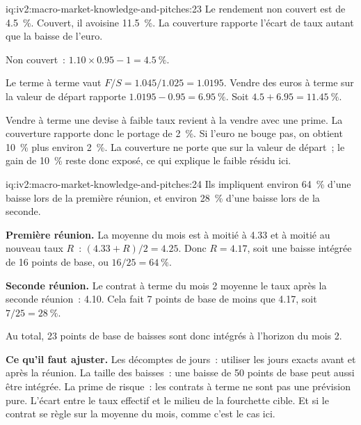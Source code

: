 \begin{solution}{iq:iv2:macro-market-knowledge-and-pitches:23}
Le rendement non couvert est de 4.5~\%. Couvert, il avoisine 11.5~\%. La couverture rapporte l'écart de taux autant que la baisse de l'euro.

Non couvert~: $1.10 \times 0.95 - 1 = 4.5~\%$.

Le terme à terme vaut $F/S = 1.045/1.025 = 1.0195$. Vendre des euros à terme sur la valeur de départ rapporte $1.0195 - 0.95 = 6.95~\%$. Soit $4.5 + 6.95 = 11.45~\%$.

Vendre à terme une devise à faible taux revient à la vendre avec une prime. La couverture rapporte donc le portage de 2~\%. Si l'euro ne bouge pas, on obtient 10~\% plus environ 2~\%. La couverture ne porte que sur la valeur de départ~; le gain de 10~\% reste donc exposé, ce qui explique le faible résidu ici.

\end{solution}

\begin{solution}{iq:iv2:macro-market-knowledge-and-pitches:24}
Ils impliquent environ 64~\% d'une baisse lors de la première réunion, et environ 28~\% d'une baisse lors de la seconde.

\textbf{Première réunion.} La moyenne du mois est à moitié à 4.33 et à moitié au nouveau taux $R$~: $(4.33 + R)/2 = 4.25$. Donc $R = 4.17$, soit une baisse intégrée de 16 points de base, ou $16/25 = 64~\%$.

\textbf{Seconde réunion.} Le contrat à terme du mois 2 moyenne le taux après la seconde réunion~: 4.10. Cela fait 7 points de base de moins que 4.17, soit $7/25 = 28~\%$.

Au total, 23 points de base de baisses sont donc intégrés à l'horizon du mois 2.

\textbf{Ce qu'il faut ajuster.} Les décomptes de jours~: utiliser les jours exacts avant et après la réunion. La taille des baisses~: une baisse de 50 points de base peut aussi être intégrée. La prime de risque~: les contrats à terme ne sont pas une prévision pure. L'écart entre le taux effectif et le milieu de la fourchette cible. Et si le contrat se règle sur la moyenne du mois, comme c'est le cas ici.

\end{solution}

